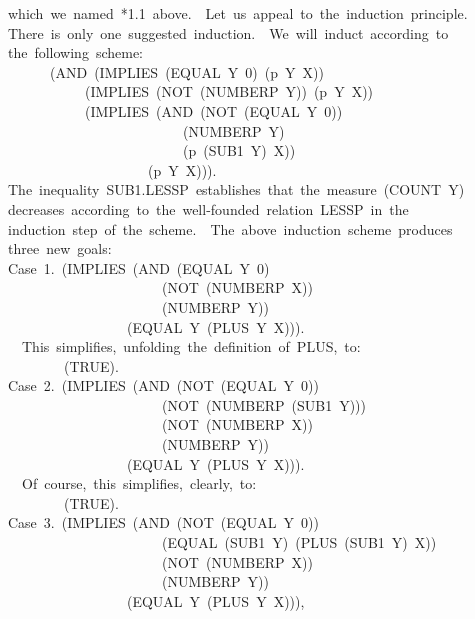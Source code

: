 \documentclass[11pt]{book}
\newenvironment{pubasis}{\begin{flushleft}\ttfamily\small}{\normalsize\rmfamily\end{flushleft}}
\begin{document}
\begin{pubasis}
which~we~named~*1.1~above.~~Let~us~appeal~to~the~induction~principle.\\
There~is~only~one~suggested~induction.~~We~will~induct~according~to\\
the~following~scheme:\\
~~~~~~(AND~(IMPLIES~(EQUAL~Y~0)~(p~Y~X))\\
~~~~~~~~~~~(IMPLIES~(NOT~(NUMBERP~Y))~(p~Y~X))\\
~~~~~~~~~~~(IMPLIES~(AND~(NOT~(EQUAL~Y~0))\\
~~~~~~~~~~~~~~~~~~~~~~~~~(NUMBERP~Y)\\
~~~~~~~~~~~~~~~~~~~~~~~~~(p~(SUB1~Y)~X))\\
~~~~~~~~~~~~~~~~~~~~(p~Y~X))).\\
The~inequality~SUB1.LESSP~establishes~that~the~measure~(COUNT~Y)\\
decreases~according~to~the~well-founded~relation~LESSP~in~the\\
induction~step~of~the~scheme.~~The~above~induction~scheme~produces\\
three~new~goals:\\

Case~1.~(IMPLIES~(AND~(EQUAL~Y~0)\\
~~~~~~~~~~~~~~~~~~~~~~(NOT~(NUMBERP~X))\\
~~~~~~~~~~~~~~~~~~~~~~(NUMBERP~Y))\\
~~~~~~~~~~~~~~~~~(EQUAL~Y~(PLUS~Y~X))).\\

~~This~simplifies,~unfolding~the~definition~of~PLUS,~to:\\

~~~~~~~~(TRUE).\\

Case~2.~(IMPLIES~(AND~(NOT~(EQUAL~Y~0))\\
~~~~~~~~~~~~~~~~~~~~~~(NOT~(NUMBERP~(SUB1~Y)))\\
~~~~~~~~~~~~~~~~~~~~~~(NOT~(NUMBERP~X))\\
~~~~~~~~~~~~~~~~~~~~~~(NUMBERP~Y))\\
~~~~~~~~~~~~~~~~~(EQUAL~Y~(PLUS~Y~X))).\\

~~Of~course,~this~simplifies,~clearly,~to:\\

~~~~~~~~(TRUE).\\

Case~3.~(IMPLIES~(AND~(NOT~(EQUAL~Y~0))\\
~~~~~~~~~~~~~~~~~~~~~~(EQUAL~(SUB1~Y)~(PLUS~(SUB1~Y)~X))\\
~~~~~~~~~~~~~~~~~~~~~~(NOT~(NUMBERP~X))\\
~~~~~~~~~~~~~~~~~~~~~~(NUMBERP~Y))\\
~~~~~~~~~~~~~~~~~(EQUAL~Y~(PLUS~Y~X))),\\


\end{pubasis}
\end{document}
